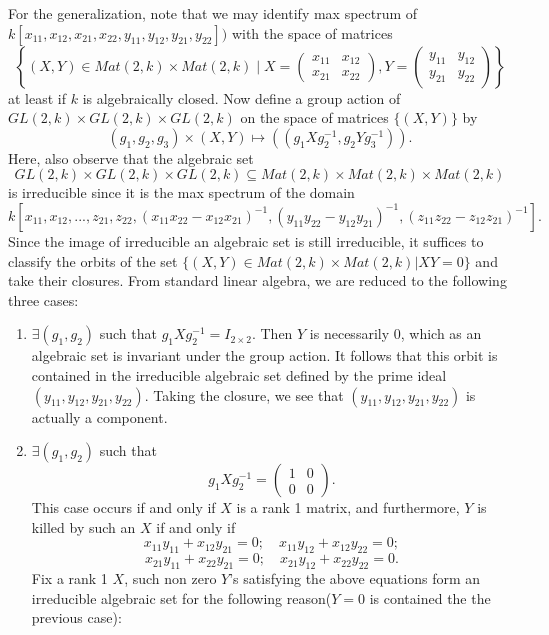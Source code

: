 \begin{example}
\medskip\noindent
For the generalization, note that we may identify max spectrum of
$k[x_{11},x_{12},x_{21},x_{22},y_{11},y_{12},y_{21},y_{22}])$
with the space of matrices
$$
\left\{ (X,Y) \in Mat(2,k)\times Mat(2,k) \mid
X = \left(
\begin{matrix}
x_{11} & x_{12}\\
x_{21} & x_{22}
\end{matrix}
\right),
Y= \left(
\begin{matrix}
y_{11} & y_{12}\\
y_{21} & y_{22}
\end{matrix}
\right)
\right\}
$$
at least if $k$ is algebraically closed.
Now define a group action of
$GL(2,k)\times GL(2,k)\times GL(2,k)$ on the space of matrices
$\{(X,Y)\}$ by
$$
(g_1,g_2,g_3) \times (X, Y) \mapsto ((g_1Xg_2^{-1}, g_2Yg_3^{-1})).
$$
Here, also observe that the algebraic set
$$
GL(2,k)\times GL(2,k)\times GL(2,k) \subseteq
Mat(2,k)\times Mat(2,k) \times Mat(2,k)
$$
is irreducible since it is the max spectrum of the domain
$$
k[x_{11},x_{12},...,z_{21},z_{22},(x_{11}x_{22}-x_{12}x_{21})^{-1}
,(y_{11}y_{22}-y_{12}y_{21})^{-1},(z_{11}z_{22}-z_{12}z_{21})^{-1}].
$$
Since the image of irreducible an algebraic set is still
irreducible, it suffices to classify the orbits of the set
$\{(X,Y)\in Mat(2,k)\times Mat(2,k)|XY=0\}$ and take their
closures. From standard linear algebra, we are reduced to the
following three cases:
\begin{enumerate}
\item $\exists (g_1,g_2)$ such that $g_1Xg_2^{-1}=I_{2\times 2}$.
Then $Y$ is necessarily $0$, which as an algebraic set is
invariant under the group action. It follows that this orbit is
contained in the irreducible algebraic set defined by the prime
ideal $(y_{11},y_{12},y_{21},y_{22})$. Taking the closure, we see
that $(y_{11},y_{12},y_{21},y_{22})$ is actually a component.
\item $\exists (g_1, g_2)$ such that $$g_1Xg_2^{-1}=\left(
\begin{matrix}
1 & 0 \\
0 & 0
\end{matrix}
\right).$$ This case occurs if and only if $X$ is a rank 1 matrix,
and furthermore, $Y$ is killed by such an $X$ if and only if
$$x_{11}y_{11}+x_{12}y_{21}=0; \quad x_{11}y_{12}+x_{12}y_{22}=0;$$
$$x_{21}y_{11}+x_{22}y_{21}=0; \quad x_{21}y_{12}+x_{22}y_{22}=0.$$
Fix a rank 1 $X$, such non zero $Y$'s satisfying the above
equations form an irreducible algebraic set for the following
reason($Y=0$ is contained the the previous case):

\end{enumerate}
\end{example}
